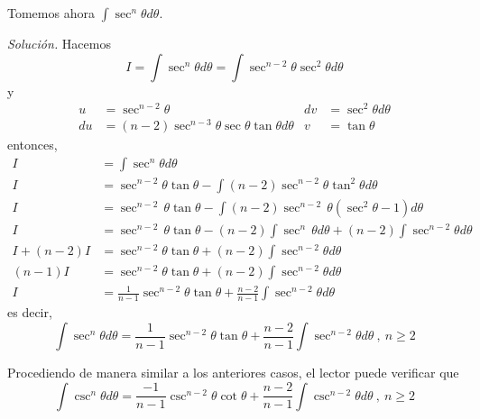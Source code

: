 \begin{ejemplo}
\textnormal{Tomemos ahora} $\displaystyle{ \int \sec ^{n}\theta d\theta}$.
\end{ejemplo}
\textit{Solución.}
Hacemos
{\small
\[
I=\int \sec ^{n}\theta d\theta=\int \sec ^{n-2}\theta \sec ^{2}\theta d\theta
\]
}
y
\begin{align*}
u&=\sec ^{n-2}\theta & dv&=\sec ^{2}\theta d\theta \\
du&=(n-2)\sec ^{n-3}\theta \sec \theta \tan \theta d\theta & v&=\tan \theta
\end{align*}
entonces,
{\small
\begin{align*}
I&=\int \sec ^{n}\theta d\theta\\
I&=\sec ^{n-2}\theta \tan \theta -\int (n-2)\sec ^{n-2}\theta \tan^{2}\theta d\theta\\
I&=\sec ^{n-2\ }\theta \tan \theta -\int (n-2)\sec ^{n-2\ }\theta (\sec
^{2}\theta -1)d\theta \\
I&=\sec ^{n-2\ }\theta \tan \theta -(n-2)\int \sec ^{n\ }\theta d\theta
+(n-2)\int \sec ^{n-2}\theta d\theta \\
I+(n-2)I&=\sec ^{n-2}\theta \tan \theta +(n-2)\int \sec ^{n-2}\theta d\theta\\
(n-1)I&=\sec ^{n-2}\theta \tan \theta +(n-2)\int \sec ^{n-2}\theta d\theta\\
I&=\frac{1}{n-1}\sec ^{n-2}\theta \tan \theta +\frac{n-2%
}{n-1}\int \sec ^{n-2}\theta d\theta
\end{align*}
}
es decir,
\[
\int \sec ^{n}\theta d\theta =\frac{1}{n-1}\sec ^{n-2}\theta \tan \theta +%
\frac{n-2}{n-1}\int \sec ^{n-2}\theta d\theta\ ,\ n\geq 2
\]

\begin{ejemplo}
\textnormal{Procediendo de manera similar a los anteriores casos, el lector puede verificar que}
\[
\int \csc ^{n}\theta d\theta=\frac{-1}{n-1}\csc ^{n-2}\theta \cot \theta +\frac{n-2}{n-1}\int \csc ^{n-2}\theta d\theta\ ,\ n\geq 2
\]
\end{ejemplo}

